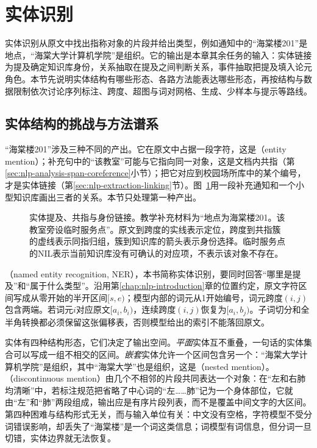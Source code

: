 \section{实体识别}
\label{sec:nlp-extraction-entities}

实体识别从原文中找出指称对象的片段并给出类型，例如通知中的“海棠楼201”是地点，“海棠大学计算机学院”是组织。它的输出是本章其余任务的输入：实体链接为提及确定知识库身份，关系抽取在提及之间判断关系，事件抽取把提及填入论元角色。本节先说明实体结构有哪些形态、各路方法能表达哪些形态，再按结构与数据限制依次讨论序列标注、跨度、超图与词对网格、生成、少样本与提示等路线。

\subsection{实体结构的挑战与方法谱系}
\label{sec:nlp-extraction-mentions}

“海棠楼201”涉及三种不同的产出。它在原文中占据一段字符，这是（entity mention）；补充句中的“该教室”可能与它指向同一对象，这是文档内共指（第\ref{sec:nlp-analysis-span-coreference}小节）；把它对应到校园场所库中的某个编号，才是实体链接（第\ref{sec:nlp-extraction-linking}节）。图~\ref{fig:nlp-extraction-identity}用一段补充通知和一个小型知识库画出三者的关系。本节只处理第一种产出。

\begin{figure}[htbp]
  \centering
  
  \caption{实体提及、共指与身份链接。教学补充材料为“地点为海棠楼201。该教室旁设临时服务点”。原文到跨度的实线表示定位，跨度到共指簇的虚线表示同指归组，簇到知识库的箭头表示身份选择。临时服务点的NIL表示当前知识库没有可确认的对应项，不表示该对象不存在。}
  \label{fig:nlp-extraction-identity}
\end{figure}

（named entity recognition, NER），本书简称实体识别，要同时回答“哪里是提及”和“属于什么类型”。沿用第\ref{chap:nlp-introduction}章的位置约定，原文字符区间写成从零开始的半开区间$[s,e)$；模型内部的词元从1开始编号，词元跨度$(i,j)$包含两端。若词元$i$对应原文$[a_i,b_i)$，连续跨度$(i,j)$恢复为$[a_i,b_j)$。子词切分和全半角转换都必须保留这张偏移表，否则模型给出的索引不能落回原文。

实体有四种结构形态，它们决定了输出空间。\emph{平面}实体互不重叠，一句话的实体集合可以写成一组不相交的区间。\emph{嵌套}实体允许一个区间包含另一个：“海棠大学计算机学院”是组织，其中“海棠大学”也是组织，这是（nested mention）。（discontinuous mention）由几个不相邻的片段共同表达一个对象：在“左和右肺均清晰”中，若标注规范把省略了中心词的“左……肺”记为一个身体部位，它就由“左”和“肺”两段组成，输出应是有序片段列表，而不是覆盖中间文字的大区间。第四种困难与结构形式无关，而与输入单位有关：中文没有空格，字符模型不受分词错误影响，却丢失了“海棠楼”是一个词这类信息；词模型有词信息，但分词一旦切错，实体边界就无法恢复。


